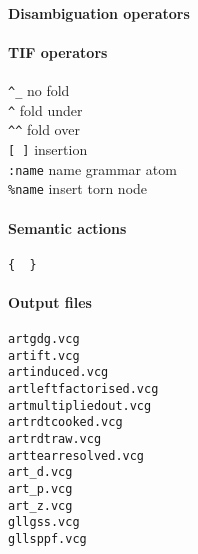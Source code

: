 \documentclass[11pt]{article}
\begin{document}
\paragraph{Disambiguation operators}
\paragraph{TIF operators}
\verb+^_+ no fold\\
\verb+^+ fold under\\
\verb+^^+ fold over\\
\verb+[ ]+ insertion\\
\verb+:name+ name grammar atom\\
\verb+%name+ insert torn node

\paragraph{Semantic actions}
\verb+{  }+

\paragraph{Output files}
\verb+artgdg.vcg+\\
\verb+artift.vcg+\\
\verb+artinduced.vcg+\\
\verb+artleftfactorised.vcg+\\
\verb+artmultipliedout.vcg+\\
\verb+artrdtcooked.vcg+\\
\verb+artrdtraw.vcg+\\
\verb+arttearresolved.vcg+\\
\verb+art_d.vcg+\\
\verb+art_p.vcg+\\
\verb+art_z.vcg+\\
\verb+gllgss.vcg+\\
\verb+gllsppf.vcg+
\end{document}
